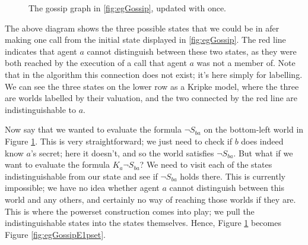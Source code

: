 \documentclass[12pt, a4paper]{article}
\begin{document}
\begin{figure}[h]
    \caption{The gossip graph in \ref{fig:egGossip}, updated with  once.}
    \label{fig:egGossipE1}
\end{figure}

The above diagram shows the three possible states that we could be in afer
making one call from the initial state displayed in \ref{fig:egGossip}. The red
line indicates that agent $a$ cannot distinguish between these two states, as
they were both reached by the execution of a call that agent $a$ was not a
member of. Note that in the algorithm this connection does not exist; it's here
simply for labelling. We can see the three states on the lower row as a Kripke
model, where the three are worlds labelled by their valuation, and the two
connected by the red line are indistinguishable to $a$.

Now say that we wanted to evaluate the formula $\neg S_{ba}$ on the bottom-left
world in Figure \ref{fig:egGossipE1}. This is very straightforward; we just need
to check if $b$ does indeed know $a$'s secret; here it doesn't, and so the world
satisfies $\neg S_{ba}$. But what if we want to evaluate the formula $K_a \neg
S_{ba}$? We need to visit each of the states indistinguishable from our state
and see if $\neg S_{ba}$ holds there. This is currently impossible; we have no
idea whether agent $a$ cannot distinguish between this world and any others, and
certainly no way of reaching those worlds if they are. This is where the
powerset construction comes into play; we pull the indistinguishable states into
the states themselves. Hence, Figure \ref{fig:egGossipE1} becomes Figure
\ref{fig:egGossipE1pset}.

\bigskip
\end{document}
